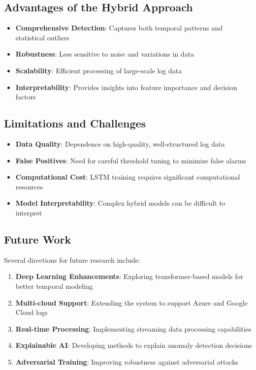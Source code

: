 \documentclass[conference]{IEEEtran}
\begin{document}
\subsection{Advantages of the Hybrid Approach}
\begin{itemize}
    \item \textbf{Comprehensive Detection}: Captures both temporal patterns and statistical outliers
    \item \textbf{Robustness}: Less sensitive to noise and variations in data
    \item \textbf{Scalability}: Efficient processing of large-scale log data
    \item \textbf{Interpretability}: Provides insights into feature importance and decision factors
\end{itemize}

\subsection{Limitations and Challenges}
\begin{itemize}
    \item \textbf{Data Quality}: Dependence on high-quality, well-structured log data
    \item \textbf{False Positives}: Need for careful threshold tuning to minimize false alarms
    \item \textbf{Computational Cost}: LSTM training requires significant computational resources
    \item \textbf{Model Interpretability}: Complex hybrid models can be difficult to interpret
\end{itemize}

\subsection{Future Work}
Several directions for future research include:

\begin{enumerate}
    \item \textbf{Deep Learning Enhancements}: Exploring transformer-based models for better temporal modeling
    \item \textbf{Multi-cloud Support}: Extending the system to support Azure and Google Cloud logs
    \item \textbf{Real-time Processing}: Implementing streaming data processing capabilities
    \item \textbf{Explainable AI}: Developing methods to explain anomaly detection decisions
    \item \textbf{Adversarial Training}: Improving robustness against adversarial attacks
\end{enumerate}
\end{document}
